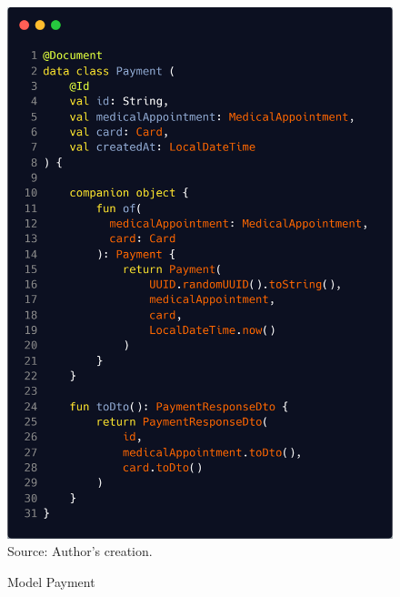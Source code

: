 \begin{figure}[H]
	\centering
	\caption{Model Payment}
	\includegraphics[width=1\linewidth]{figures/payment}
	\label{fig:payment}
	\footnotesize Source: Author's creation.
\end{figure}
